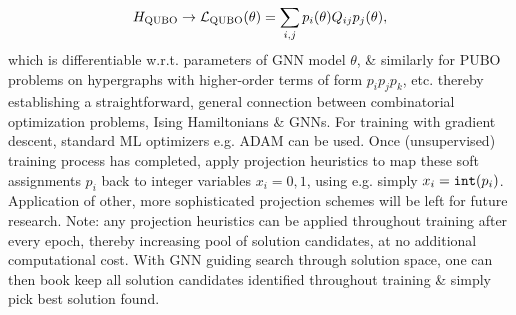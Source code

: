 \documentclass{article}
\begin{document}
\begin{itemize}
    \begin{equation*}
        H_{\rm QUBO}\to{\cal L}_{\rm QUBO}(\theta) = \sum_{i,j} p_i(\theta)Q_{ij}p_j(\theta),
    \end{equation*}
    which is differentiable w.r.t. parameters of GNN model $\theta$, \& similarly for PUBO problems on hypergraphs with higher-order terms of form $p_ip_jp_k$, etc. thereby establishing a straightforward, general connection between combinatorial optimization problems, Ising Hamiltonians \& GNNs. For training with gradient descent, standard ML optimizers e.g. ADAM can be used. Once (unsupervised) training process has completed, apply projection heuristics to map these soft assignments $p_i$ back to integer variables $x_i = 0,1$, using e.g. simply $x_i = {\tt int}(p_i)$. Application of other, more sophisticated projection schemes will be left for future research. Note: any projection heuristics can be applied throughout training after every epoch, thereby increasing pool of solution candidates, at no additional computational cost. With GNN guiding search through solution space, one can then book keep all solution candidates identified throughout training \& simply pick best solution found.


\end{itemize}
\end{document}

